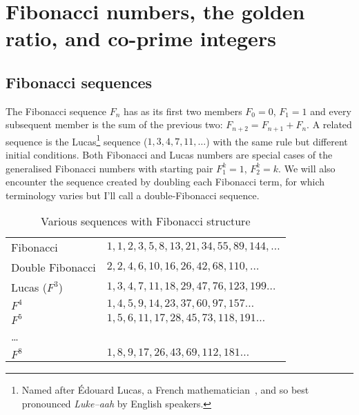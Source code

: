 
\chapter{Fibonacci numbers, the golden ratio, and co-prime integers}

\label{CH:0}
\label{ch:0}
\section{Fibonacci sequences}

The Fibonacci sequence $F_n$ has as its first two members  $F_0=0$, $F_1=1$ and every subsequent member is the sum of the previous two:  $F_{n+2}=F_{n+1}+F_{n}$. 
A related sequence is the Lucas\footnote{Named after Édouard Lucas, a French mathematician~\cite{ballotLucasSequencesTheory2023,decaillotEdouardLucas184218911999}, and so best pronounced \textit{Luke--aah} by English speakers.} sequence  ($1,3,4,7,11,\ldots$) with the same rule but different initial conditions. Both Fibonacci and Lucas numbers are special cases of the generalised Fibonacci numbers with starting pair $F^k_1=1$, $F^k_2=k$. We will also encounter the sequence created by doubling each Fibonacci term, for which terminology varies but I'll call a double-Fibonacci sequence. 
%
\begin{table}[ht]
	\caption{Various sequences with Fibonacci structure}
	\label{tab:sequences}
	\begin{center}
		\begin{tabular}{ll}
			\hline
			Fibonacci  &  $1,1,2,3,5,8,13,21,34,55,89,144,\ldots$ 
			\\
			Double Fibonacci & $2,2,4,6,10,16,26,42,68,110,\ldots$
			\\
			Lucas ($F^3$)&      $ 1,3,4,7,11,18,29,47,76,123,199\ldots$
			\\
			$F^4$  & $1,4,5,9,14,23,37,60,97,157\ldots$
			\\
			$F^5$ & $1,5,6,11,17,28,45,73,118,191\ldots$
			\\
			\ldots &
			\\
			$F^8$ & $1,8,9,17,26,43,69,112,181\ldots$
			\\
			\hline
		\end{tabular}
	
	\end{center}
\end{table}
%

